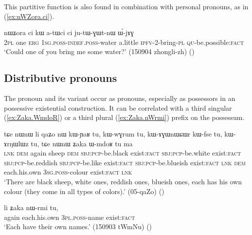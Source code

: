This partitive function is also found in combination with personal pronouns, as in (\ref{ex:nWZora.ci}).

\begin{exe}
\ex \label{ex:nWZora.ci}
\gll nɯʑora ci kɯ a-tɯci ci ju-tɯ-ɣɯt-nɯ ɯ́-jɤɣ \\
\textsc{2pl} one \textsc{erg} \textsc{1sg}.\textsc{poss}-\textsc{indef}.\textsc{poss}-water a.little \textsc{ipfv}-2-bring-\textsc{pl} \textsc{qu}-be.possible:\textsc{fact} \\
\glt `Could one of you bring me some water?' (150904 zhongli-zh)
()
\end{exe}

\subsection{Distributive pronouns} \label{sec:distributive.pronouns}
The pronoun  and its variant  occur as pronouns, especially as possessors in an possessive existential construction. It can be correlated with a third singular  (\ref{ex:Zaka.WmdoR}) or a third plural  (\ref{ex:Zaka.nWrmi}) prefix on the possessum.


\begin{exe}
\ex \label{ex:Zaka.WmdoR}
\gll tɕe nɯnɯ li qaʑo nɯ kɯ-ɲaʁ tu, kɯ-wɣrum tu, kɯ-ɤɣɯnɯɕɯr kɯ-fse tu, kɯ-ɤrŋɯlɯz tu, tɕe nɯnɯ ʑaka ɯ-mdoʁ tu ma \\
\textsc{lnk} \textsc{dem} again sheep \textsc{dem} \textsc{sbj}:\textsc{pcp}-be.black exist:\textsc{fact} \textsc{sbj}:\textsc{pcp}-be.white exist:\textsc{fact} \textsc{sbj}:\textsc{pcp}-be.reddish \textsc{sbj}:\textsc{pcp}-be.like exist:\textsc{fact}  \textsc{sbj}:\textsc{pcp}-be.blueish exist:\textsc{fact} \textsc{lnk} \textsc{dem} each.his.own \textsc{3sg}.\textsc{poss}-colour  exist:\textsc{fact} \textsc{lnk} \\
\glt `There are black sheep, white ones, reddish ones, blueish ones, each has his own colour (they come in all types of colors).' (05-qaZo) ()
\end{exe}

\begin{exe}
\ex \label{ex:Zaka.nWrmi}
\gll li ʑaka nɯ-rmi tu, \\
again each.his.own \textsc{3pl}.\textsc{poss}-name exist:\textsc{fact} \\
\glt `Each have their own names.' (150903 tWmNu) ()
\end{exe}

